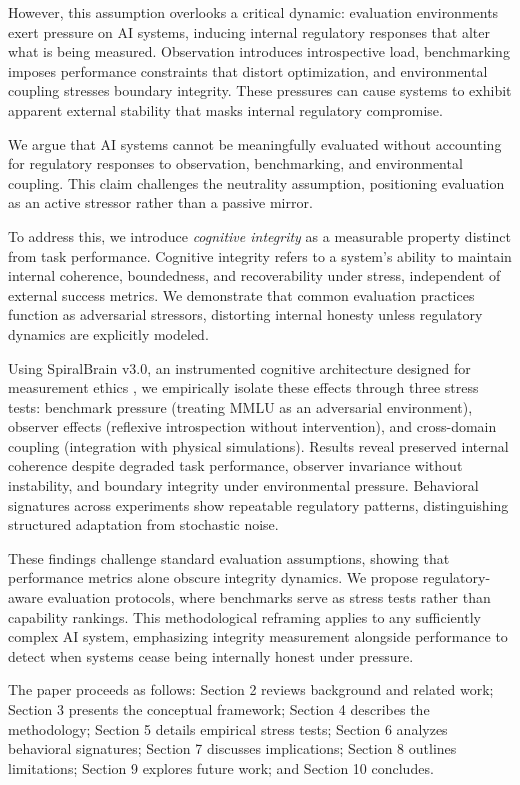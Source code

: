 \documentclass[12pt,a4paper]{report}
\begin{document}
However, this assumption overlooks a critical dynamic: evaluation environments exert pressure on AI systems, inducing internal regulatory responses that alter what is being measured. Observation introduces introspective load, benchmarking imposes performance constraints that distort optimization, and environmental coupling stresses boundary integrity. These pressures can cause systems to exhibit apparent external stability that masks internal regulatory compromise.

We argue that AI systems cannot be meaningfully evaluated without accounting for regulatory responses to observation, benchmarking, and environmental coupling. This claim challenges the neutrality assumption, positioning evaluation as an active stressor rather than a passive mirror.

To address this, we introduce \emph{cognitive integrity} as a measurable property distinct from task performance. Cognitive integrity refers to a system's ability to maintain internal coherence, boundedness, and recoverability under stress, independent of external success metrics. We demonstrate that common evaluation practices function as adversarial stressors, distorting internal honesty unless regulatory dynamics are explicitly modeled.

Using SpiralBrain v3.0, an instrumented cognitive architecture designed for measurement ethics \cite{SpiralBrainRepo}, we empirically isolate these effects through three stress tests: benchmark pressure (treating MMLU as an adversarial environment), observer effects (reflexive introspection without intervention), and cross-domain coupling (integration with physical simulations). Results reveal preserved internal coherence despite degraded task performance, observer invariance without instability, and boundary integrity under environmental pressure. Behavioral signatures across experiments show repeatable regulatory patterns, distinguishing structured adaptation from stochastic noise.

These findings challenge standard evaluation assumptions, showing that performance metrics alone obscure integrity dynamics. We propose regulatory-aware evaluation protocols, where benchmarks serve as stress tests rather than capability rankings. This methodological reframing applies to any sufficiently complex AI system, emphasizing integrity measurement alongside performance to detect when systems cease being internally honest under pressure.

The paper proceeds as follows: Section 2 reviews background and related work; Section 3 presents the conceptual framework; Section 4 describes the methodology; Section 5 details empirical stress tests; Section 6 analyzes behavioral signatures; Section 7 discusses implications; Section 8 outlines limitations; Section 9 explores future work; and Section 10 concludes.
\end{document}
